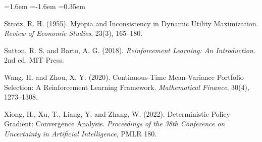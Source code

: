 \documentclass[11pt,a4paper]{article}
\theoremstyle{plain}
\theoremstyle{definition}
\begin{document}
\begin{list}{}{\leftmargin=1.6em \itemindent=-1.6em \itemsep=0.35em}
\item Strotz, R. H. (1955). Myopia and Inconsistency in Dynamic Utility Maximization.
\emph{Review of Economic Studies}, 23(3), 165--180.

\item Sutton, R. S. and Barto, A. G. (2018). \emph{Reinforcement Learning: An
Introduction}. 2nd ed. MIT Press.

\item Wang, H. and Zhou, X. Y. (2020). Continuous-Time Mean-Variance Portfolio
Selection: A Reinforcement Learning Framework. \emph{Mathematical Finance}, 30(4),
1273--1308.

\item Xiong, H., Xu, T., Liang, Y. and Zhang, W. (2022). Deterministic Policy Gradient:
Convergence Analysis. \emph{Proceedings of the 38th Conference on Uncertainty in
Artificial Intelligence}, PMLR 180.

\end{list}
\end{document}
